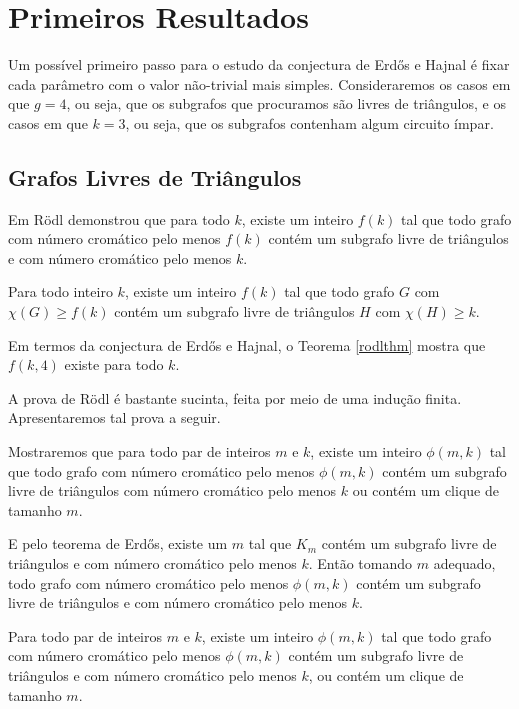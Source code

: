 \chapter{Primeiros Resultados}
\label{cap:livretriangulos}

Um possível primeiro passo para o estudo da conjectura de Erd\H{o}s e Hajnal é fixar cada parâmetro com o valor não-trivial mais simples. Consideraremos os casos em que $g=4$, ou seja, que os subgrafos que procuramos são livres de triângulos, e os casos em que $k=3$, ou seja, que os subgrafos contenham algum circuito ímpar.

\section{Grafos Livres de Triângulos}

Em \cite{rodl1977chromatic} R\"{o}dl demonstrou que para todo $k$, existe um inteiro $f(k)$ tal que todo grafo com número cromático pelo menos $f(k)$ contém um subgrafo livre de triângulos e com número cromático pelo menos $k$. 

\begin{teorema}\label{rodlthm}
Para todo inteiro $k$, existe um inteiro $f(k)$ tal que todo grafo $G$ com $\chi(G) \geq f(k)$ contém um subgrafo livre de triângulos $H$ com $\chi(H) \geq k$.
\end{teorema}

Em termos da conjectura de Erd\H{o}s e Hajnal, o Teorema \ref{rodlthm} mostra que $f(k,4)$ existe para todo $k$.

A prova de R\"{o}dl é bastante sucinta, feita por meio de uma indução finita. Apresentaremos tal prova a seguir.

Mostraremos que para todo par de inteiros $m$ e $k$, existe um inteiro $\phi(m,k)$ tal que todo grafo com número cromático pelo menos $\phi(m,k)$ contém um subgrafo livre de triângulos com número cromático pelo menos $k$ ou contém um clique de tamanho $m$. 

E pelo teorema de Erd\H{o}s, existe um $m$ tal que $K_m$ contém um subgrafo livre de triângulos e com número cromático pelo menos $k$. Então tomando $m$ adequado, todo grafo com número cromático pelo menos $\phi(m,k)$ contém um subgrafo livre de triângulos e com número cromático pelo menos $k$.

\begin{lema}\label{livretriangulolema1}
Para todo par de inteiros $m$ e $k$, existe um inteiro $\phi(m,k)$ tal que todo grafo com número cromático pelo menos $\phi(m,k)$ contém um subgrafo livre de triângulos e com número cromático pelo menos $k$, ou contém um clique de tamanho $m$.
\end{lema}

